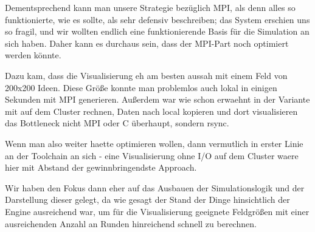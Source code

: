 Dementsprechend kann man unsere Strategie bezüglich MPI, als denn alles
so funktionierte, wie es sollte, als sehr defensiv beschreiben; das
System erschien uns so fragil, und wir wollten endlich eine
funktionierende Basis für die Simulation an sich haben. Daher kann es
durchaus sein, dass der MPI-Part noch optimiert werden könnte.

Dazu kam, dass die Visualisierung eh am besten aussah mit einem Feld von
200x200 Ideen. Diese Größe konnte man problemlos auch lokal in einigen
Sekunden mit MPI generieren. Außerdem war wie schon erwaehnt in der
Variante mit auf dem Cluster rechnen, Daten nach local kopieren und dort
visualisieren das Bottleneck nicht MPI oder C überhaupt, sondern rsync.

Wenn man also weiter haette optimieren wollen, dann vermutlich in erster
Linie an der Toolchain an sich - eine Visualisierung ohne I/O auf dem
Cluster waere hier mit Abstand der gewinnbringendste Approach.

Wir haben den Fokus dann eher auf das Ausbauen der Simulationslogik und
der Darstellung dieser gelegt, da wie gesagt der Stand der Dinge
hinsichtlich der Engine ausreichend war, um für die Visualisierung
geeignete Feldgrößen mit einer ausreichenden Anzahl an Runden
hinreichend schnell zu berechnen.
